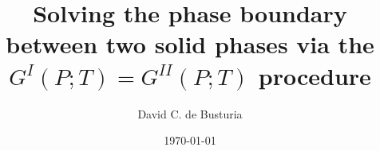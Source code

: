 \documentclass{beamer}
\title[Your Short Title]{Solving the phase boundary between two solid phases via the $G^{I}(P; T) = G^{II}(P; T)$ procedure}
\author{David C. de Busturia}
\institute{Department of Chemistry. Imperial College London}
\date{\today} %
\begin{document}
\def\folders{10.00K,
30.10K,
50.20K,
70.30K,
90.40K,
110.51K,
130.61K,
150.71K,
170.81K,
190.91K,
211.01K,
231.11K,
251.21K,
271.31K,
291.41K,
311.52K,
331.62K,
351.72K}



\newcommand{\Funkytable}[1]{
$T = {#1}$
}



\begin{frame}
  \titlepage
\end{frame}
\end{document}
